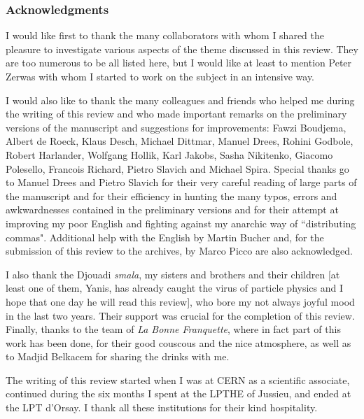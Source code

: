 \subsubsection*{Acknowledgments}

I would like first to thank the many collaborators with whom I shared the
pleasure to investigate various aspects of the theme discussed in this review. 
They are too numerous to be all listed here, but I would like at least to
mention Peter Zerwas with whom I started to work on the subject in an intensive
way.\s

I would also like to thank the many colleagues and friends who helped me during
the writing of this review and who made important remarks on the preliminary
versions of the manuscript and suggestions for improvements: Fawzi Boudjema,
Albert de Roeck, Klaus Desch, Michael Dittmar, Manuel Drees, Rohini Godbole,
Robert Harlander, Wolfgang Hollik, Karl Jakobs, Sasha Nikitenko, Giacomo
Polesello, Francois Richard, Pietro Slavich and Michael Spira.  Special thanks
go to Manuel Drees and Pietro Slavich for their very careful reading of large
parts of the manuscript and for their efficiency in hunting the many typos,
errors and awkwardnesses contained in the preliminary versions and for their
attempt at improving my poor English and fighting against my anarchic way of
``distributing commas". Additional help with the English by Martin Bucher and,
for the submission of this review to the archives, by Marco Picco are also
acknowledged. \s

I also thank the Djouadi {\it smala}, my sisters and brothers and their
children [at least one of them, Yanis, has already caught the virus of particle
physics and I hope that one day he will read this review], who bore my not
always joyful mood in the last two years. Their support was crucial for the
completion of this review. Finally, thanks to the team of {\it La Bonne
Franquette}, where in fact part of this work has been done, for their good
couscous and the nice atmosphere, as well as to Madjid Belkacem for sharing the
drinks with me.\s 

The writing of this review  started when I was at CERN as a scientific
associate, continued during the six months I spent at the LPTHE of Jussieu, 
and ended at the LPT d'Orsay. I thank all these institutions for their kind
hospitality. 

\newpage

\setcounter{section}{0} 
\renewcommand{\thesection}{\arabic{section}}
